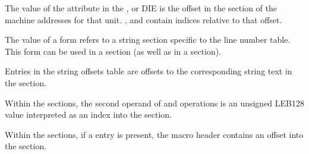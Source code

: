 \begin{description}
The value of the \DWATaddrbase{} attribute in the 
\DWTAGcompileunit, \DWTAGpartialunit{} or \DWTAGtypeunit{} DIE 
is the offset in the \dotdebugaddr{} section of the machine 
addresses for that unit.
\DWFORMaddrxXN, \DWOPaddrx{} and \DWOPconstx{} contain indices 
relative to that offset.

\bb
{}
The value of a \DWFORMlinestrp{} form refers to a string section specific
to the line number table. This form can be used in a \dotdebuglinedwo{} section
(as well as in a \dotdebuginfodwo{} section).

Entries in the string offsets table are offsets to the corresponding string text
in the \dotdebugstrdwo{} section.

Within the \dotdebugmacrodwo{} sections, the second operand of \DWMACROdefinestrx{}
and \DWMACROundefstrx{} operations is an unsigned LEB128 value interpreted as an
index into the \dotdebugstroffsetsdwo{} section.
\db

Within the \dotdebugmacrodwo{} sections, if a \DWMACROstartfile{} entry is present,
the macro header contains an offset into the \dotdebuglinedwo{} section.

\eb

\end{description}